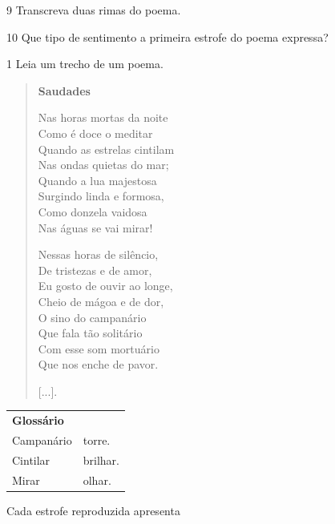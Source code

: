 \num{9} Transcreva duas rimas do poema.



\num{10} Que tipo de sentimento a primeira estrofe do poema expressa?


\pagebreak
{}

\num{1} Leia um trecho de um poema.

\begin{verse}
\textbf{Saudades}

Nas horas mortas da noite\\
Como é doce o meditar\\
Quando as estrelas cintilam\\
Nas ondas quietas do mar;\\
Quando a lua majestosa\\
Surgindo linda e formosa,\\
Como donzela vaidosa\\
Nas águas se vai mirar!

Nessas horas de silêncio,\\
De tristezas e de amor,\\
Eu gosto de ouvir ao longe,\\
Cheio de mágoa e de dor,\\
O sino do campanário\\
Que fala tão solitário\\
Com esse som mortuário\\
Que nos enche de pavor.

{[}...{]}.

\end{verse}

\begin{tabular}{ll}
\textbf{Glossário} & \mbox{}\\
Campanário & torre.\\
Cintilar & brilhar.\\
Mirar & olhar.
\end{tabular}

\bigskip

Cada estrofe reproduzida apresenta

